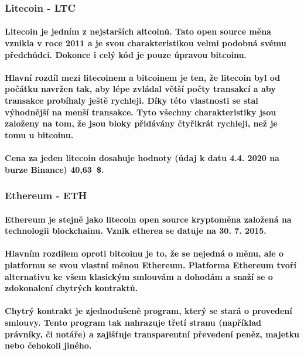 \documentclass[thesis=B,czech]{FITthesis}[2019/03/21]
\begin{document}
\subsubsection{Litecoin - LTC}
\paragraph{
Litecoin je jedním z nejstarších altcoinů. Tato open source měna vznikla v roce 2011 a je svou charakteristikou velmi podobná svému předchůdci. \cite{litecoin} Dokonce i celý kód je pouze úpravou bitcoinu. \cite{alza_monero}
}
\paragraph{
Hlavní rozdíl mezi litecoinem a bitcoinem je ten, že litecoin byl od počátku navržen tak, aby lépe zvládal větší počty transakcí a aby transakce probíhaly ještě rychleji. Díky této vlastnosti se stal výhodnější na menší transakce. Tyto všechny charakteristiky jsou založeny na tom, že jsou bloky přidávány čtyřikrát rychleji, než je tomu u bitcoinu. \cite{litecoin}
}
\paragraph{
Cena za jeden litecoin dosahuje hodnoty (údaj k datu 4.4. 2020 na burze Binance) 40,63~\$. \cite{binance_markets}
}
\subsubsection{Ethereum - ETH}
\paragraph{
Ethereum je stejně jako litecoin open source kryptoměna založená na technologii blockchainu. Vznik etherea se datuje na 30. 7. 2015. 
}
\paragraph{
Hlavním rozdílem oproti bitcoinu je to, že se nejedná o měnu, ale o platformu se svou vlastní měnou Ethereum. Platforma Ethereum tvoří alternativu ke všem klasickým smlouvám a dohodám a snaží se o zdokonalení chytrých kontraktů. \cite{btc_vs_eth}
}
\paragraph{
Chytrý kontrakt je zjednodušeně program, který se stará o provedení smlouvy. Tento program tak nahrazuje třetí stranu (například právníky, či notáře) a zajišťuje transparentní převedení peněz, majetku nebo čehokoli jiného. \cite{ethereum}
}
\end{document}
